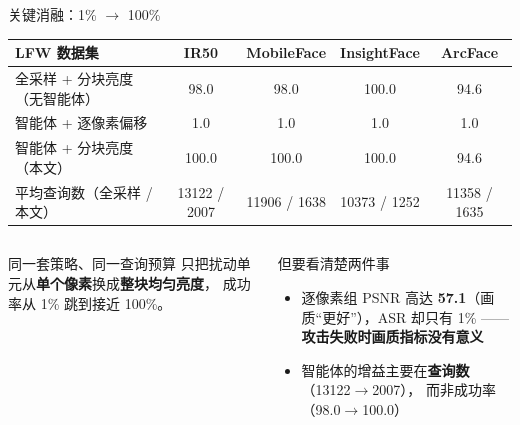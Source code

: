 \begin{frame}{关键消融：1\% $\rightarrow$ 100\%}

  \begin{center}
    \scriptsize
    \begin{tabular}{lcccc}
      \toprule
      LFW 数据集 & IR50 & MobileFace & InsightFace & ArcFace \\
      \midrule
      全采样 + 分块亮度（无智能体） & 98.0 & 98.0 & 100.0 & 94.6 \\
      智能体 + \alert{逐像素偏移}     & \alert{1.0} & \alert{1.0} & \alert{1.0} & \alert{1.0} \\
      智能体 + 分块亮度（本文）        & 100.0 & 100.0 & 100.0 & 94.6 \\
      \midrule
      平均查询数（全采样 / 本文）      & 13122 / 2007 & 11906 / 1638 & 10373 / 1252 & 11358 / 1635 \\
      \bottomrule
    \end{tabular}
  \end{center}

  \vspace{-0.2em}
  \begin{columns}[T]
    \begin{alertblock}{同一套策略、同一查询预算}
      \scriptsize
      只把扰动单元从\textbf{单个像素}换成\textbf{整块均匀亮度}，
      成功率从 1\% 跳到接近 100\%。
    \end{alertblock}

    \begin{exampleblock}{但要看清楚两件事}
      \scriptsize
      \begin{itemize}
        \item 逐像素组 PSNR 高达 \textbf{57.1}（画质“更好”），ASR 却只有 1\%
              —— \textbf{攻击失败时画质指标没有意义}
        \item 智能体的增益主要在\textbf{查询数}（13122$\rightarrow$2007），
              而非成功率（98.0$\rightarrow$100.0）
      \end{itemize}
    \end{exampleblock}
  \end{columns}
\end{frame}

